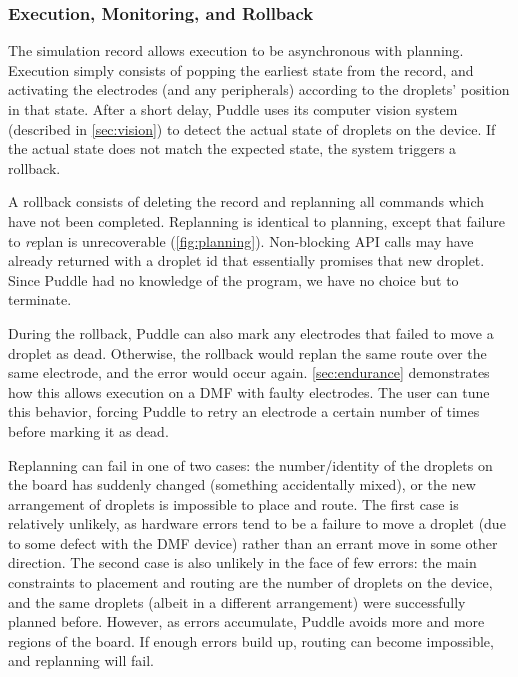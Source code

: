 \documentclass[sigconf, screen]{acmart}
\newcommand\karin[1]{\todo[color=green!80]{\sf #1}}
\newcommand\philip[1]{\todo[color=orange!40]{\sf #1}}
\begin{document}
\subsubsection{Execution, Monitoring, and Rollback}

The simulation record allows execution to be asynchronous with planning.
Execution simply consists of popping the earliest state from the record, and activating the electrodes (and any peripherals) according to the droplets' position in that state.
After a short delay, Puddle uses its computer vision system (described in \autoref{sec:vision}) to detect the actual state of droplets on the device.
If the actual state does not match the expected state, the system triggers a rollback.
\philip{cite krish here}

A rollback consists of deleting the record and replanning all commands which have not been completed.
Replanning is identical to planning, except that failure to \emph{re}plan is unrecoverable (\autoref{fig:planning}).
Non-blocking API calls may have already returned with a droplet id that essentially promises that new droplet.
Since Puddle had no knowledge of the program, we have no choice but to terminate.

During the rollback, Puddle can also mark any electrodes that failed to move a droplet as dead.
Otherwise, the rollback would replan the same route over the same electrode, and the error would occur again.
\autoref{sec:endurance} demonstrates how this allows execution on a DMF with faulty electrodes.
The user can tune this behavior, forcing Puddle to retry an electrode a certain number of times before marking it as dead.

Replanning can fail in one of two cases: the number/identity of the droplets on the board has suddenly changed (something accidentally mixed), or the new arrangement of droplets is impossible to place and route.
The first case is relatively unlikely, as hardware errors tend to be a failure to move a droplet (due to some defect with the DMF device) rather than an errant move in some other direction.
The second case is also unlikely in the face of few errors: the main constraints to placement and routing are the number of droplets on the device, and the same droplets (albeit in a different arrangement) were successfully planned before.
However, as errors accumulate, Puddle avoids more and more regions of the board.
If enough errors build up, routing can become impossible, and replanning will fail.
\end{document}

